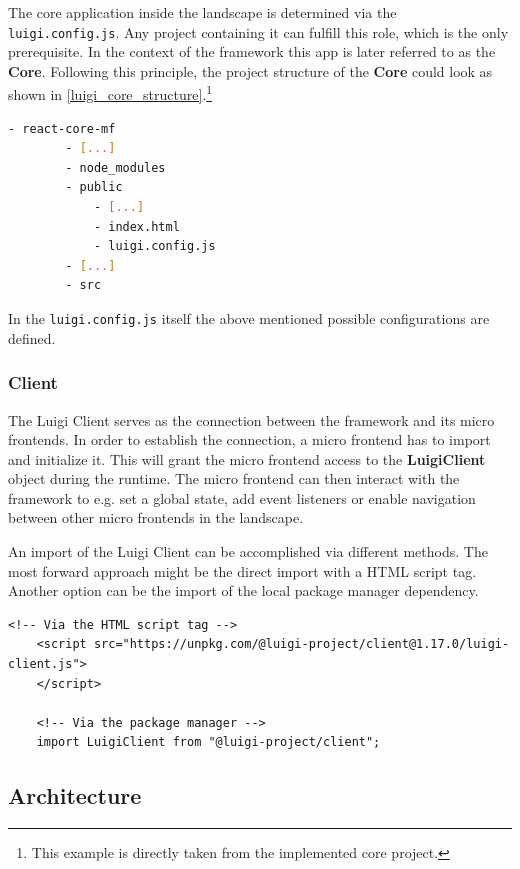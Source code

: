 The core application inside the landscape is determined via the \texttt{luigi.config.js}. Any project containing it can fulfill this role, which is the only prerequisite. In the context of the framework this app is later referred to as the \textbf{Core}.
Following this principle, the project structure of the \textbf{Core} could look as shown in \ref{luigi_core_structure}.\footnote{This example is directly taken from the implemented core project.}  

\begin{lstlisting}[language=Bash, caption=Project structure for a Luigi Core application including the \texttt{luigi.config.js}, label=luigi_core_structure]
	- react-core-mf
		- [...]
		- node_modules
		- public
			- [...]
			- index.html
			- luigi.config.js
		- [...]
		- src
\end{lstlisting}

In the \texttt{luigi.config.js} itself the above mentioned possible configurations are defined.\cite{luigi_doc_core}

\subsubsection{Client}

The Luigi Client serves as the connection between the framework and its micro frontends. In order to establish the connection, a micro frontend has to import and initialize it. This will grant the micro frontend access to the \textbf{LuigiClient} object during the runtime. The micro frontend can then interact with the framework to e.g. set a global state, add event listeners or enable navigation between other micro frontends in the landscape.

An import of the Luigi Client can be accomplished via different methods. The most forward approach might be the direct import with a HTML script tag. Another option can be the import of the local package manager dependency.\cite{luigi_client}

\begin{lstlisting}[caption=Import methods of the Luigi Client]
	<!-- Via the HTML script tag -->
	<script src="https://unpkg.com/@luigi-project/client@1.17.0/luigi-client.js">
	</script>
	
	<!-- Via the package manager -->
	import LuigiClient from "@luigi-project/client";
\end{lstlisting}

\subsection{Architecture}

